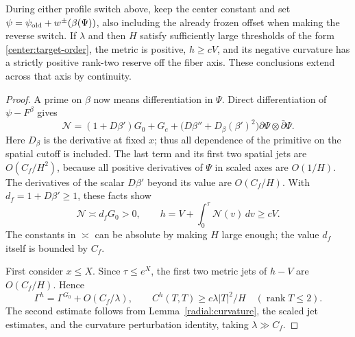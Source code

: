 \begin{lemma}\label{center:interpolation}
During either profile switch above, keep the center constant and set
$\psi=\psi_{\rm old}+w^\pm(\beta(\Psi))$, also including the already frozen offset when making the reverse switch. If $\lambda$ and then $H$ satisfy sufficiently large thresholds of the form \eqref{center:target-order}, the metric is positive, $h\ge cV$, and its negative curvature has a strictly positive rank-two reserve off the fiber axis. These conclusions extend across that axis by continuity.
\end{lemma}

\begin{proof}
A prime on $\beta$ now means differentiation in $\Psi$. Direct differentiation of $\psi-F^\beta$ gives
\begin{equation}\label{center:N-formula}
 \mathcal N=(1+D\beta')G_0+G_e
       +\bigl(D\beta''+D_\beta(\beta')^2\bigr)
                   \partial\Psi\otimes\bar\partial\Psi.
\end{equation}
Here $D_\beta$ is the derivative at fixed $x$; thus all dependence of the primitive on the spatial cutoff is included. The last term and its first two spatial jets are $O(C_f/H^2)$, because all positive derivatives of $\Psi$ in scaled axes are $O(1/H)$. The derivatives of the scalar $D\beta'$ beyond its value are $O(C_f/H)$. With $d_f=1+D\beta'\ge1$, these facts show
\[
 \mathcal N\asymp d_fG_0>0,
 \qquad h=V+\int_0^\tau\mathcal N(v)\,dv\ge cV.
\]
The constants in $\asymp$ can be absolute by making $H$ large enough; the value $d_f$ itself is bounded by $C_f$.

First consider $x\le X$. Since $\tau\le e^X$, the first two metric jets of $h-V$ are $O(C_f/H)$. Hence
\begin{equation}\label{center:finite-x-h}
 \Gamma^h=\Gamma^{G_0}+O(C_f/\lambda),\qquad
 C^h(T,T)\ge c\lambda|T|^2/H
 \quad(\operatorname{rank}T\le2).
\end{equation}
The second estimate follows from Lemma~\ref{radial:curvature}, the scaled jet estimates, and the curvature perturbation identity, taking $\lambda\gg C_f$.


\end{proof}
